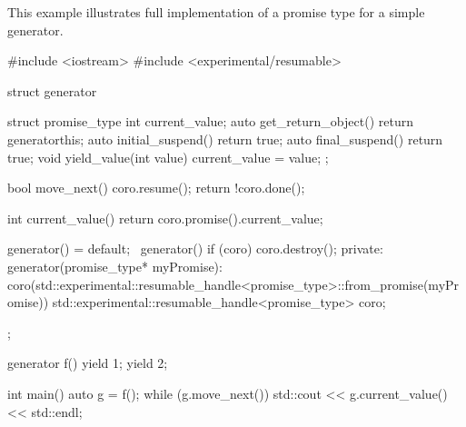 \enterexample
This example illustrates full implementation
of a promise type for a simple generator.
\begin{codeblock}
  #include <iostream>
  #include <experimental/resumable>
  
  struct generator {
    struct promise_type {
      int current_value;
      auto get_return_object() { return generator{this}; }
      auto initial_suspend() { return true; }
      auto final_suspend() { return true; }
      void yield_value(int value) { current_value = value; }
    };
    
    bool move_next() {
      coro.resume();
      return !coro.done();
    }
    
    int current_value() { return coro.promise().current_value; }
    
    generator() = default;
    ~generator() { if (coro) { coro.destroy(); } }
  private:
    generator(promise_type* myPromise):
       coro(std::experimental::resumable_handle<promise_type>::from_promise(myPromise)) {
    }
    std::experimental::resumable_handle<promise_type> coro;
  };
  
  generator f() {
    yield 1;
    yield 2;
  } 
  
  int main() {
    auto g = f();
    while (g.move_next()) std::cout << g.current_value() << std::endl;
  }
  
\end{codeblock}
\exitexample